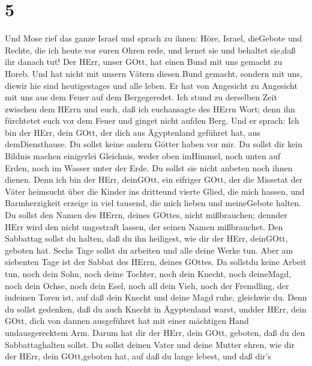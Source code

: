 \hypertarget{section-4}{%
\section{5}\label{section-4}}

 Und Mose rief das ganze Israel und sprach zu ihnen: Höre,
Israel, dieGebote und Rechte, die ich heute vor euren Ohren rede, und
lernet sie und behaltet sie,daß ihr danach tut!  Der HErr,
unser GOtt, hat einen Bund mit uns gemacht zu Horeb.  Und
hat nicht mit unsern Vätern diesen Bund gemacht, sondern mit uns, diewir
hie sind heutigestages und alle leben.  Er hat von Angesicht
zu Angesicht mit uns aus dem Feuer auf dem Bergegeredet. 
Ich stund zu derselben Zeit zwischen dem HErrn und euch, daß ich
euchansagte des HErrn Wort; denn ihn fürchtetet euch vor dem Feuer und
ginget nicht aufden Berg. Und er sprach:  Ich bin der HErr,
dein GOtt, der dich aus Ägyptenland geführet hat, aus demDiensthause.
 Du sollst keine andern Götter haben vor mir. 
Du sollst dir kein Bildnis machen einigerlei Gleichnis, weder oben
imHimmel, noch unten auf Erden, noch im Wasser unter der Erde.
 Du sollst sie nicht anbeten noch ihnen dienen. Denn ich bin
der HErr, deinGOtt, ein eifriger GOtt, der die Missetat der Väter
heimsucht über die Kinder ins dritteund vierte Glied, die mich hassen,
 und Barmherzigkeit erzeige in viel tausend, die mich
lieben und meineGebote halten.  Du sollst den Namen des
HErrn, deines GOttes, nicht mißbrauchen; dennder HErr wird den nicht
ungestraft lassen, der seinen Namen mißbrauchet.  Den
Sabbattag sollst du halten, daß du ihn heiligest, wie dir der HErr,
deinGOtt, geboten hat.  Sechs Tage sollst du arbeiten und
alle deine Werke tun.  Aber am siebenten Tage ist der
Sabbat des HErrn, deines GOttes. Da sollstdu keine Arbeit tun, noch dein
Sohn, noch deine Tochter, noch dein Knecht, noch deineMagd, noch dein
Ochse, noch dein Esel, noch all dein Vieh, noch der Fremdling, der
indeinen Toren ist, auf daß dein Knecht und deine Magd ruhe, gleichwie
du.  Denn du sollst gedenken, daß du auch Knecht in
Ägyptenland warst, undder HErr, dein GOtt, dich von dannen ausgeführet
hat mit einer mächtigen Hand undausgerecktem Arm. Darum hat dir der
HErr, dein GOtt, geboten, daß du den Sabbattaghalten sollst.
 Du sollst deinen Vater und deine Mutter ehren, wie dir der
HErr, dein GOtt,geboten hat, auf daß du lange lebest, und daß dir's
